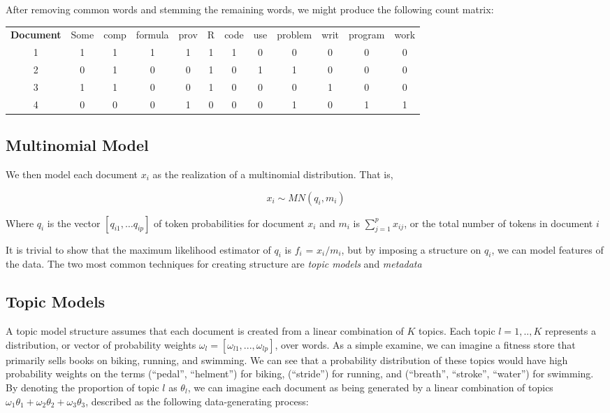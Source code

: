 \documentclass[12pt]{article}
\begin{document}
After removing common words and stemming the remaining words, we might
produce the following count matrix:

\begin{tabular}{ c |  c c c c c c c c c c c}
\hline
\textbf{Document} & Some & comp & formula & prov & R & code & use &
problem & writ & program & work \\
1 & 1 & 1 & 1 & 1 & 1 & 1 & 0 & 0 & 0 & 0 & 0 \\
2 & 0 & 1 & 0 & 0 & 1 & 0 & 1 & 1 & 0 & 0 & 0 \\
3 & 1 & 1 & 0 & 0 & 1 & 0 & 0 & 0 & 1 & 0 & 0\\
4 & 0 & 0 & 0 & 1 & 0 & 0 & 0 & 1 & 0 & 1 & 1\\
\hline
\end{tabular}

\subsection{Multinomial Model}\label{multinomial-model}

We then model each document $x_i$ as the realization of a multinomial
distribution. That is,

\[ x_{i} \sim MN(q_i,m_i) \]

Where $q_i$ is the vector $[q_{i1}, \dots q_{ip}]$ of token
probabilities for document $x_i$ and $m_i$ is
$\sum_{j = 1}^{p}{x_{ij}}$, or the total number of tokens in document
$i$

It is trivial to show that the maximum likelihood estimator of $q_i$ is
$f_i$ = $x_i / m_i$, but by imposing a structure on $q_i$, we can model
features of the data. The two most common techniques for creating
structure are \emph{topic models} and \emph{metadata}

\subsection{Topic Models}\label{topic-models}

A topic model structure assumes that each document is created from a
linear combination of $K$ topics. Each topic $l = 1,..,K$ represents a
distribution, or vector of probability weights
$\omega_l = [\omega_{l1}, ... , \omega_{lp}]$, over words. As a simple
examine, we can imagine a fitness store that primarily sells books on
biking, running, and swimming. We can see that a probability
distribution of these topics would have high probability weights on the
terms (``pedal'', ``helment'') for biking, (``stride'') for running, and
(``breath'', ``stroke'', ``water'') for swimming. By denoting the
proportion of topic $l$ as $\theta_l$, we can imagine each document as
being generated by a linear combination of topics
$\omega_1 \theta_1 + \omega_2 \theta_2 + \omega_3 \theta_3$, described
as the following data-generating process:
\end{document}
